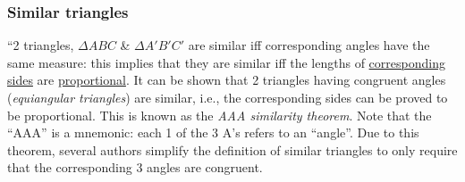 \documentclass{article}
\begin{document}
\subsubsection{Similar triangles}
``2 triangles, $\Delta ABC$ \& $\Delta A'B'C'$ are similar iff corresponding angles have the same measure: this implies that they are similar iff the lengths of \href{https://en.wikipedia.org/wiki/Corresponding_sides}{corresponding sides} are \href{https://en.wikipedia.org/wiki/Proportionality_(mathematics)}{proportional}. It can be shown that 2 triangles having congruent angles (\textit{equiangular triangles}) are similar, i.e., the corresponding sides can be proved to be proportional. This is known as the \textit{AAA similarity theorem}. Note that the ``AAA'' is a mnemonic: each 1 of the 3 A's refers to an ``angle''. Due to this theorem, several authors simplify the definition of similar triangles to only require that the corresponding 3 angles are congruent.
\end{document}
